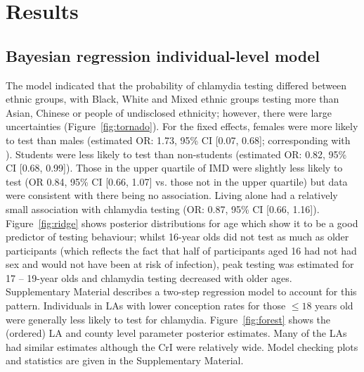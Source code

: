 \documentclass[fleqn,10pt]{wlscirep}
\begin{document}
\section*{Results}

\subsection*{Bayesian regression individual-level model}
The model indicated that the probability of chlamydia testing differed between ethnic groups, with Black, White and Mixed ethnic groups testing more than Asian, Chinese or people of undisclosed ethnicity; however, there were large uncertainties (Figure~\ref{fig:tornado}). For the fixed effects, females were more likely to test than males (estimated OR: 1.73, 95\% CI [0.07, 0.68]; corresponding with \cite{Sonnenberg2013}). Students were less likely to test than non-students (estimated OR: 0.82, 95\% CI [0.68, 0.99]). Those in the upper quartile of IMD were slightly less likely to test (OR 0.84, 95\% CI [0.66, 1.07] vs. those not in the upper quartile) but data were consistent with there being no association. Living alone had a relatively small association with chlamydia testing (OR: 0.87, 95\% CI [0.66, 1.16]). Figure~\ref{fig:ridge} shows posterior distributions for age which show it to be a good predictor of testing behaviour; whilst 16-year olds did not test as much as older participants (which reflects the fact that half of participants aged 16 had not had sex and would not have been at risk of infection), peak testing was estimated for 17 – 19-year olds and chlamydia testing decreased with older ages. Supplementary Material describes a two-step regression model to account for this pattern. Individuals in LAs with lower conception rates for those $\leq 18$ years old were generally less likely to test for chlamydia. Figure~\ref{fig:forest} shows the (ordered) LA and county level parameter posterior estimates. Many of the LAs had similar estimates although the CrI were relatively wide. Model checking plots and statistics are given in the Supplementary Material.
\end{document}
